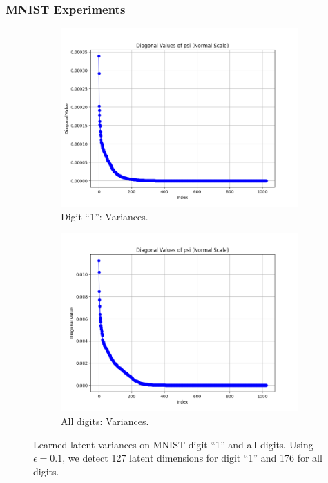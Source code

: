     \subsubsection{MNIST Experiments}
    \label{sec:mnist_experiments}
    \begin{figure}[h!]
        \centering
        \begin{subfigure}[b]{0.45\textwidth}
            \includegraphics[width=\textwidth]{Chapter5/results/mnist/digit_1_variances.png}
            \caption{\scriptsize Digit ``1'': Variances.}
        \end{subfigure}
        \begin{subfigure}[b]{0.45\textwidth}
            \includegraphics[width=\textwidth]{Chapter5/results/mnist/all_digits_variances.png}
            \caption{\scriptsize All digits: Variances.}
        \end{subfigure}
        \caption{Learned latent variances on MNIST digit ``1'' and all digits. Using $\epsilon = 0.1$, we detect 127 latent dimensions for digit ``1'' and 176 for all digits.}
        \label{fig:mnist_variances}
    \end{figure}

